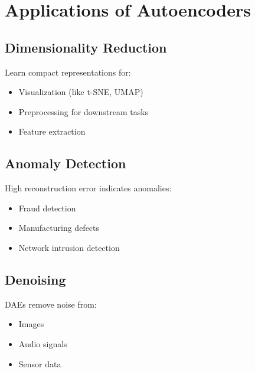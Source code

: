 
\section{Applications of Autoencoders}
\label{sec:ae-applications}

\subsection{Dimensionality Reduction}

Learn compact representations for:
\begin{itemize}
    \item Visualization (like t-SNE, UMAP)
    \item Preprocessing for downstream tasks
    \item Feature extraction
\end{itemize}

\subsection{Anomaly Detection}

High reconstruction error indicates anomalies:
\begin{itemize}
    \item Fraud detection
    \item Manufacturing defects
    \item Network intrusion detection
\end{itemize}

\subsection{Denoising}

DAEs remove noise from:
\begin{itemize}
    \item Images
    \item Audio signals
    \item Sensor data
\end{itemize}
